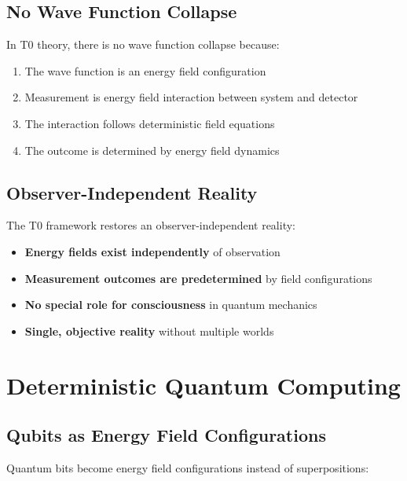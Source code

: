 \documentclass[12pt,a4paper]{report}
\begin{document}
	\subsection{No Wave Function Collapse}
	\label{subsec:no_collapse}
	
	In T0 theory, there is no wave function collapse because:
	
	\begin{enumerate}
		\item The wave function is an energy field configuration
		\item Measurement is energy field interaction between system and detector
		\item The interaction follows deterministic field equations
		\item The outcome is determined by energy field dynamics
	\end{enumerate}
	
	\subsection{Observer-Independent Reality}
	\label{subsec:observer_independent_reality}
	
	The T0 framework restores an observer-independent reality:
	
	\begin{itemize}
		\item \textbf{Energy fields exist independently} of observation
		\item \textbf{Measurement outcomes are predetermined} by field configurations
		\item \textbf{No special role for consciousness} in quantum mechanics
		\item \textbf{Single, objective reality} without multiple worlds
	\end{itemize}
	
	\section{Deterministic Quantum Computing}
	\label{sec:deterministic_quantum_computing}
	
	\subsection{Qubits as Energy Field Configurations}
	\label{subsec:qubits_energy_fields}
	
	Quantum bits become energy field configurations instead of superpositions:
	
\end{document}

